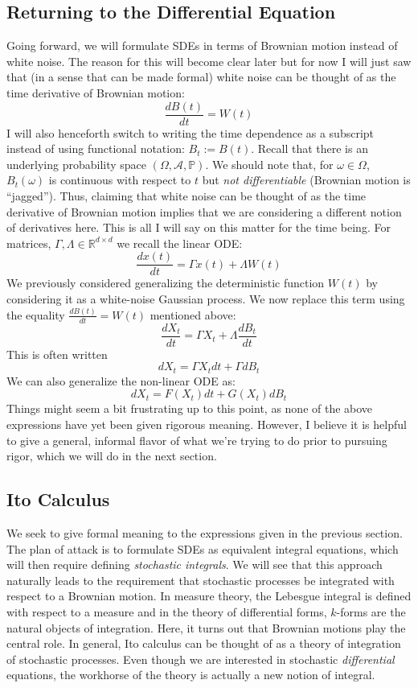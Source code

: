 \documentclass[12pt]{article}
\newcommand{\R}{\mathcal{R}}
\newcommand{\Prob}{\mathbb{P}}
\def\R{\mathbb{R}}
\begin{document}
\subsection{Returning to the Differential Equation}
Going forward, we will formulate SDEs in terms of Brownian motion instead of white noise. The reason for this will become clear later but for now I will 
just saw that (in a sense that can be made formal) white noise can be thought of as the time derivative of Brownian motion: 
\[\frac{dB(t)}{dt} = W(t)\]
I will also henceforth switch to writing the time dependence as a subscript instead of using functional notation: $B_t := B(t)$. 
Recall that there is an underlying probability space $(\Omega, \mathcal{A}, \Prob)$. We should note that, for $\omega \in \Omega$, $B_t(\omega)$
is continuous with respect to $t$ but \textit{not differentiable} (Brownian motion is ``jagged''). Thus, claiming that white noise can be thought of as the 
time derivative of Brownian motion implies that we are considering a different notion of derivatives here. This is all I will say on this matter for the time 
being. For matrices, $\Gamma, \Lambda \in \R^{d \times d}$ we recall the linear ODE:
\[\frac{dx(t)}{dt} = \Gamma x(t) + \Lambda W(t) \]
We previously considered generalizing the deterministic function $W(t)$ by considering it as a white-noise Gaussian process. We now replace this term 
using the equality $\frac{dB(t)}{dt} = W(t)$ mentioned above: 
\[\frac{dX_t}{dt} = \Gamma X_t + \Lambda \frac{dB_t}{dt} \]
This is often written 
\[dX_t = \Gamma X_t dt + \Gamma dB_t\]
We can also generalize the non-linear ODE as: 
\[dX_t = F(X_t) dt + G(X_t) dB_t\]
Things might seem a bit frustrating up to this point, as none of the above expressions have yet been given rigorous meaning. However, I believe it is helpful 
to give a general, informal flavor of what we're trying to do prior to pursuing rigor, which we will do in the next section. 

\subsection{Ito Calculus}
We seek to give formal meaning to the expressions given in the previous section. The plan of attack is to formulate SDEs as equivalent integral equations, which will 
then require defining \textit{stochastic integrals}. We will see that this approach naturally leads to the requirement that stochastic processes be integrated with respect to
 a Brownian motion. In measure theory, the Lebesgue integral is defined with respect to a measure and in the theory of differential forms, $k$-forms are the natural objects 
 of integration. Here, it turns out that Brownian motions play the central role. In general, Ito calculus can be thought of as a theory of integration of stochastic processes. 
 Even though we are interested in stochastic \textit{differential} equations, the workhorse of the theory is actually a new notion of integral. 
 
\end{document}
